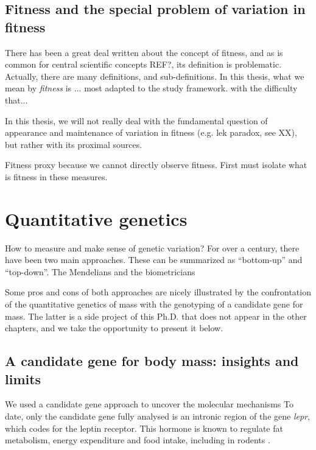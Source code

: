 \subsection{Fitness and the special problem of variation in fitness}
There has been a great deal written about the concept of fitness, and as is common for central scientific concepts REF?, its definition is problematic. Actually, there are many definitions, and sub-definitions. 
In this thesis, what we mean by \emph{fitness} is ...
most adapted to the study framework.
with the difficulty that... 

In this thesis, we will not really deal with the fundamental question of appearance and maintenance of variation in fitness (e.g. lek paradox, see XX), but rather with its proximal sources.

Fitness proxy because we cannot directly observe fitness. First must isolate what is fitness in these measures. 



 
\section{Quantitative genetics}

How to measure and make sense of genetic variation?
For over a century, there have been two main approaches. 
These can be summarized as ``bottom-up'' and ``top-down''.
The Mendelians and the biometricians

Some pros and cons of both approaches are nicely illustrated by the confrontation of the quantitative genetics of mass with the genotyping of a candidate gene for mass. The latter is a side project of this Ph.D. that does not appear in the other chapters, and we take the opportunity to present it below.

\subsection{A candidate gene for body mass: insights and limits}

We used a candidate gene approach to uncover the molecular mechanisms 
To date, only the candidate gene fully analysed is an intronic region of the gene \emph{lepr}, which codes for the leptin receptor. This hormone is known to regulate fat metabolism, energy expenditure and food intake, including in rodents \parencite{Houseknecht1998}.

